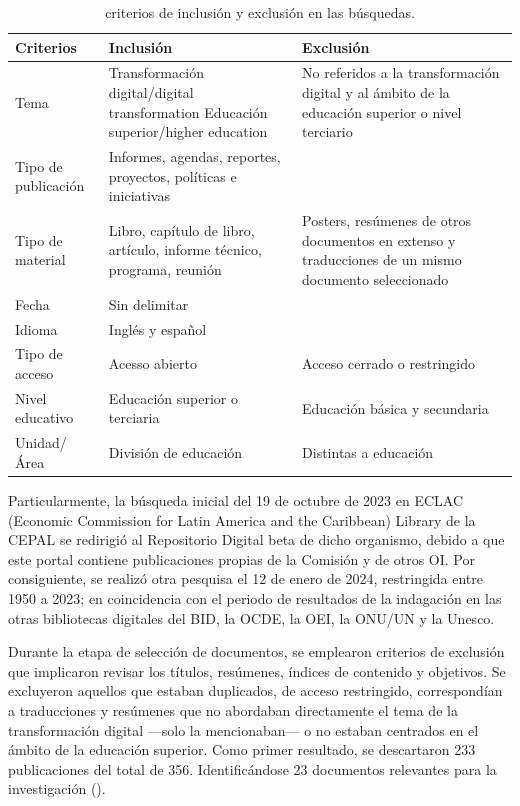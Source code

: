     \begin{table}[htpb]
        \centering
        \small
        \caption{criterios de inclusión y exclusión en las búsquedas.}
        \label{tab-03}
        \begin{tabular}{
        >{\raggedright\arraybackslash}p{}
        >{\raggedright\arraybackslash}p{}
        >{\raggedright\arraybackslash}p{}
        }
            \toprule
            Criterios & Inclusión & Exclusión \\
            \midrule
            Tema & Transformación digital/digital transformation
            Educación superior/higher education &
            No referidos a la transformación digital y al ámbito de la educación superior o nivel terciario \\
            Tipo de publicación & Informes, agendas, reportes, proyectos, políticas e iniciativas & \\
            Tipo de material & Libro, capítulo de libro, artículo, informe técnico, programa, reunión & Posters, resúmenes de otros documentos en extenso y traducciones de un mismo documento seleccionado \\
            Fecha & Sin delimitar & \\
            Idioma & Inglés y español & \\
            Tipo de acceso & Acesso abierto & Acceso cerrado o restringido \\
            Nivel educativo & Educación superior o terciaria & Educación básica y secundaria \\
            Unidad/Área & División de educación & Distintas a educación\\
            \bottomrule
        \end{tabular}
    \end{table}
    
    Particularmente, la búsqueda inicial del 19 de octubre de 2023 en ECLAC
    (Economic Commission for Latin America and the Caribbean) Library de la
    CEPAL se redirigió al Repositorio Digital beta de dicho organismo,
    debido a que este portal contiene publicaciones propias de la Comisión y
    de otros OI. Por consiguiente, se realizó otra pesquisa el 12 de enero
    de 2024, restringida entre 1950 a 2023; en coincidencia con el periodo
    de resultados de la indagación en las otras bibliotecas digitales del
    BID, la OCDE, la OEI, la ONU/UN y la Unesco.
    
    Durante la etapa de selección de documentos, se emplearon criterios de
    exclusión que implicaron revisar los títulos, resúmenes, índices de
    contenido y objetivos. Se excluyeron aquellos que estaban duplicados, de
    acceso restringido, correspondían a traducciones y resúmenes que no
    abordaban directamente el tema de la transformación digital ---solo la
    mencionaban--- o no estaban centrados en el ámbito de la educación
    superior. Como primer resultado, se descartaron 233 publicaciones del
    total de 356. Identificándose 23 documentos relevantes para la
    investigación ().

